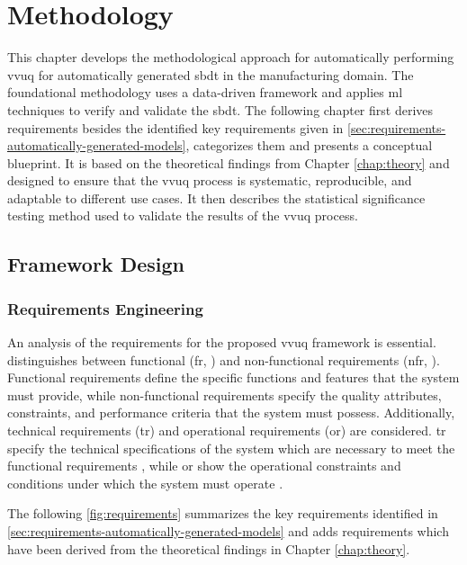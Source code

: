 \chapter{Methodology}
\label{chap:methodology}
This chapter develops the methodological approach for automatically performing \gls{vvuq} for automatically generated \gls{sbdt} in the manufacturing domain. The foundational methodology uses a data-driven framework and applies \gls{ml} techniques to verify and validate the \gls{sbdt}. The following chapter first derives requirements besides the identified key requirements given in \autoref{sec:requirements-automatically-generated-models}, categorizes them and presents a conceptual blueprint. It is based on the theoretical findings from Chapter \ref{chap:theory} and designed to ensure that the \gls{vvuq} process is systematic, reproducible, and adaptable to different use cases. It then describes the statistical significance testing method used to validate the results of the \gls{vvuq} process.

\section{Framework Design}
\subsection{Requirements Engineering}
An analysis of the requirements for the proposed \gls{vvuq} framework is essential. \Textcite{sindhgatta2005functional} distinguishes between functional (\gls{fr}, \textcite{van2001goal}) and non-functional requirements (\gls{nfr}, \textcite{glinz2005rethinking}). Functional requirements define the specific functions and features that the system must provide, while non-functional requirements specify the quality attributes, constraints, and performance criteria that the system must possess. Additionally, technical requirements (\gls{tr}) and operational requirements (\gls{or}) are considered. \gls{tr} specify the technical specifications of the system which are necessary to meet the functional requirements \autocite{chikh2012new}, while \gls{or} show the operational constraints and conditions under which the system must operate \autocite{incose2023incose}.

The following \autoref{fig:requirements} summarizes the key requirements identified in \autoref{sec:requirements-automatically-generated-models} and adds requirements which have been derived from the theoretical findings in Chapter \ref{chap:theory}.

